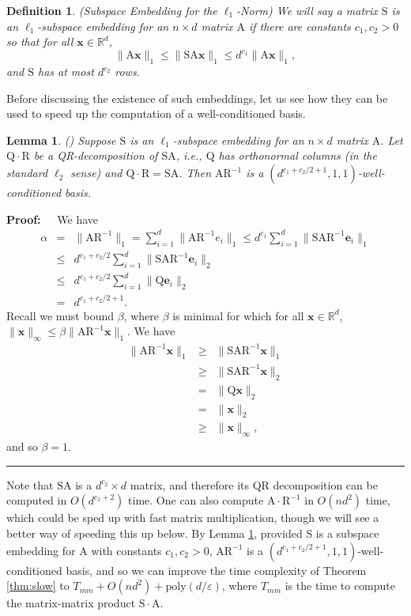 \documentclass[11pt]{article}
\newtheorem{lemma}[theorem]{Lemma}
\newtheorem{definition}[theorem]{Definition}
\newenvironment{proof}{\begin{trivlist} \item {\bf Proof:~~}}
  {\qed\end{trivlist}}
\newcommand{\mat}[1]{{\ensuremath{\bm{\mathrm{#1}}}}}
\def\e{{\mathbf e}}
\def\matA{\mat{A}}
\def\matQ{\mat{Q}}
\def\matR{\mat{R}}
\def\matS{\mat{S}}
\def\qed{\hfill\rule{2mm}{2mm}}
\def\x{{\mathbf x}}
\newcommand{\eps}{\varepsilon}
\newcommand{\poly}{{\mathrm{poly}}}
\begin{document}
\begin{definition}(Subspace Embedding for the $\ell_1$-Norm)
We will say a matrix $\matS$ is an $\ell_1$-subspace embedding for an $n \times d$ matrix 
$\matA$ if there are constants $c_1, c_2 > 0$ so that for all $\x \in \mathbb{R}^d$,
$$\|\matA \x\|_1 \leq \|\matS \matA \x\|_1 \leq d^{c_1} \|\matA \x\|_1,$$
and $\matS$ has at most $d^{c_2}$ rows. 
\end{definition}
Before discussing the existence of such embeddings, let us see how they can be used to speed up the computation of a well-conditioned basis.
\begin{lemma}\label{lem:wcbse}(\cite{sw11})
Suppose $\matS$ is an $\ell_1$-subspace embedding for an $n \times d$ matrix $\matA$. Let $\matQ \cdot \matR$ 
be a QR-decomposition of $\matS \matA$, i.e., $\matQ$ has orthonormal
columns (in the standard $\ell_2$ sense) and $\matQ \cdot \matR = \matS \matA$. Then $\matA \matR^{-1}$ 
is a $(d^{c_1+c_2/2+1}, 1, 1)$-well-conditioned basis.
\end{lemma}
\begin{proof}
We have 
\begin{eqnarray*}
\alpha & = & \|\matA \matR^{-1}\|_1 = \sum_{i=1}^d \|\matA \matR^{-1}e_i\|_1 \leq d^{c_1} \sum_{i=1}^d \|\matS \matA \matR^{-1} \e_i\|_1\\
& \leq & d^{c_1 + c_2/2} \sum_{i=1}^d \|\matS \matA \matR^{-1} \e_i\|_2\\
& \leq & d^{c_1+c_2/2} \sum_{i=1}^d \|\matQ \e_i\|_2\\
& = & d^{c_1+c_2/2+1}.
\end{eqnarray*}
Recall we must bound $\beta$, where $\beta$ is minimal for which for all $\x \in \mathbb{R}^d$,
$\|\x\|_{\infty} \leq \beta \|\matA \matR^{-1}\x\|_1$. We have
\begin{eqnarray*}
\|\matA \matR^{-1} \x\|_1 & \geq & \|\matS \matA \matR^{-1} \x\|_1\\
& \geq & \|\matS \matA \matR^{-1} \x\|_2\\
& = & \|\matQ \x\|_2\\
& = & \|\x\|_2\\
& \geq & \|\x\|_{\infty},
\end{eqnarray*}
and so $\beta = 1$. 
\end{proof}
Note that $\matS \matA$ is a $d^{c_2} \times d$ matrix, and therefore its QR decomposition can be computed in $O(d^{c_2+2})$ time. One can also
compute $\matA \cdot \matR^{-1}$ in $O(nd^2)$ time, which could be sped up with fast matrix multiplication, though we will see a better way
of speeding this up below. By Lemma \ref{lem:wcbse}, provided $\matS$ is a subspace embedding for $\matA$ with constants $c_1, c_2 > 0$, $\matA \matR^{-1}$
is a $(d^{c_1+c_2/2+1}, 1, 1)$-well-conditioned basis, and so we can improve
the time complexity of Theorem \ref{thm:slow} to $T_{mm} + O(nd^2) + \poly(d/\eps)$, 
where $T_{mm}$ is the time to compute the matrix-matrix
product $\matS \cdot \matA$. 
\end{document}
